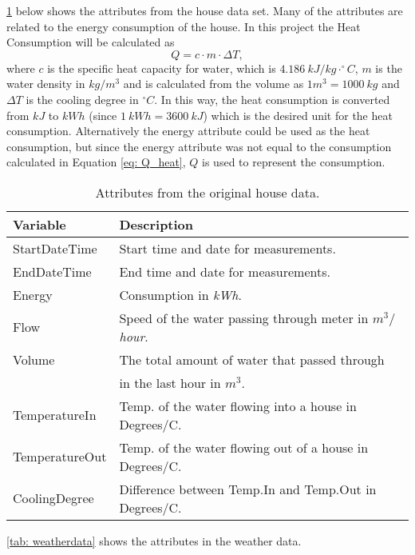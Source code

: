 \noindent \cref{tab: housedata} below shows the attributes from the house data set. Many of the attributes are related to the energy consumption of the house. In this project the  Heat Consumption will be calculated as
\begin{equation}
    Q = c\cdot m \cdot \Delta T,
    \label{eq: Q_heat}
\end{equation}
where $c$ is the specific heat capacity for water, which is $4.186 \ kJ/kg\cdot ^{\circ}C$, $m$ is the water density in $kg/m^3$ and is calculated from the volume as $1m^3 = 1000 \ kg$ and $\Delta T$ is the cooling degree in $^{\circ}C$. In this way, the heat consumption is converted from $kJ$ to $kWh$ (since $1 \ kWh = 3600 \ kJ$) which is the desired unit for the heat consumption. Alternatively the energy attribute could be used as the heat consumption, but since the energy attribute was not equal to the consumption calculated in Equation \ref{eq: Q_heat}, $Q$ is used to represent the consumption.
\begin{table}[ht]
    \centering
    \begin{tabular}{ll}
     \hline
     \textbf{Variable} & \textbf{Description} \\
    \hline
    \hline
    StartDateTime  &  Start time and date for measurements.\\
    EndDateTime  &  End time and date for measurements.\\
    Energy  &  Consumption in \textit{kWh}.\\
    Flow  &  Speed of the water passing through meter in \textit{$m^3/$hour}.\\
    Volume & The total amount of water that passed through\\ &in the last hour in $m^3$.\\
    TemperatureIn  &  Temp. of the water flowing into a house in Degrees/C. \\
    TemperatureOut  & Temp. of the water flowing out of a house in Degrees/C.\\
    CoolingDegree  &  Difference between Temp.In and Temp.Out in Degrees/C. \\
    \hline
    \end{tabular}
    \caption{Attributes from the original house data.}
    \label{tab: housedata}
\end{table}
\noindent \cref{tab: weatherdata} shows the attributes in the weather data.
